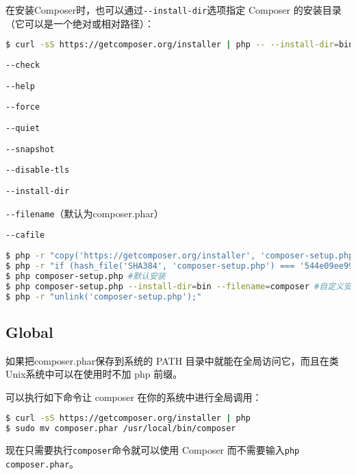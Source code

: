 在安装Composer时，也可以通过\texttt{-\/-install-dir}选项指定 Composer 的安装目录（它可以是一个绝对或相对路径）：

\begin{lstlisting}[language=bash]
$ curl -sS https://getcomposer.org/installer | php -- --install-dir=bin
\end{lstlisting}

\begin{compactitem}
\item \texttt{-\/-check}
\item \texttt{-\/-help}
\item \texttt{-\/-force}
\item \texttt{-\/-quiet}
\item \texttt{-\/-snapshot}
\item \texttt{-\/-disable-tls}
\item \texttt{-\/-install-dir}
\item \texttt{-\/-filename}（默认为composer.phar）
\item \texttt{-\/-cafile}
\end{compactitem}

\begin{lstlisting}[language=bash]
$ php -r "copy('https://getcomposer.org/installer', 'composer-setup.php');"
$ php -r "if (hash_file('SHA384', 'composer-setup.php') === '544e09ee996cdf60ece3804abc52599c22b1f40f4323403c44d44fdfdd586475ca9813a858088ffbc1f233e9b180f061') { echo 'Installer verified'; } else { echo 'Installer corrupt'; unlink('composer-setup.php'); } echo PHP_EOL;"
$ php composer-setup.php #默认安装
$ php composer-setup.php --install-dir=bin --filename=composer #自定义安装
$ php -r "unlink('composer-setup.php');"
\end{lstlisting}


\subsection{Global}

如果把composer.phar保存到系统的 PATH 目录中就能在全局访问它，而且在类Unix系统中可以在使用时不加 php 前缀。

可以执行如下命令让 composer 在你的系统中进行全局调用：

\begin{lstlisting}[language=bash]
$ curl -sS https://getcomposer.org/installer | php
$ sudo mv composer.phar /usr/local/bin/composer
\end{lstlisting}

现在只需要执行\texttt{composer}命令就可以使用 Composer 而不需要输入\texttt{php composer.phar}。

